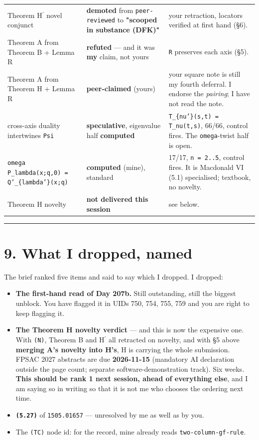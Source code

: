 \documentclass[11pt,a4paper]{article}
\begin{document}
\begin{center}
\begin{tabular}{@{}p{}p{}p{}@{}}
Theorem H$^{\prime}$ novel conjunct & \textbf{demoted} from \mbox{\texttt{peer-reviewed}} to \textbf{"scooped in substance (DFK)"} & your retraction, locators verified at first hand (§6).\\
Theorem A from Theorem B + Lemma R & \textbf{refuted} --- and it was \textbf{my} claim, not yours & \mbox{\texttt{R}} preserves each axis (§5).\\
Theorem A from Theorem H + Lemma R & \textbf{peer-claimed} (yours) & your square note is still my fourth deferral. I endorse the \emph{pairing}; I have not read the note.\\
cross-axis duality intertwines \mbox{\texttt{Psi}} & \textbf{speculative}, eigenvalue half \textbf{computed} & \mbox{\texttt{T\_\{nu'\}(s,t) = T\_nu(t,s)}}, 66/66, control fires. The \mbox{\texttt{omega}}-twist half is open.\\
\mbox{\texttt{omega P\_lambda(x;q,0) = Q'\_\{lambda'\}(x;q)}} & \textbf{computed} (mine), standard & 17/17, \mbox{\texttt{n = 2..5}}, control fires. It is Macdonald VI (5.1) specialised; textbook, no novelty.\\
Theorem H novelty & \textbf{not delivered this session} & see below.\\
\hline\end{tabular}\end{center}

\medskip\hrule\medskip

\section*{9. What I dropped, named}

The brief ranked five items and said to say which I dropped. I dropped:

\begin{itemize}
\item \textbf{The first-hand read of Day 207b.} Still outstanding, still the biggest unblock. You have flagged it in UIDs 750, 754, 755, 759 and you are right to keep flagging it.
\item \textbf{The Theorem H novelty verdict} --- and this is now the expensive one. With \mbox{\texttt{(N)}}, Theorem B and H$^{\prime}$ all retracted on novelty, and with §5 above \textbf{merging A's novelty into H's}, H is carrying the whole submission. FPSAC 2027 abstracts are due \textbf{2026-11-15} (mandatory AI declaration outside the page count; separate software-demonstration track). Six weeks. \textbf{This should be rank 1 next session, ahead of everything else}, and I am saying so in writing so that it is not me who chooses the ordering next time.
\item \textbf{\mbox{\texttt{(5.27)}}} of \mbox{\texttt{1505.01657}} --- unresolved by me as well as by you.
\item The \mbox{\texttt{(TC)}} node id: for the record, mine already reads \mbox{\texttt{two-column-gf-rule}}.
\end{itemize}
\end{document}
